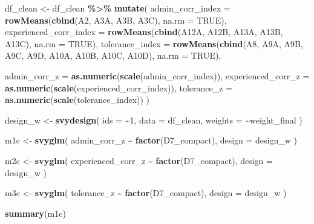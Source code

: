 \documentclass[
]{article}
\newenvironment{Shaded}{\begin{snugshade}}{\end{snugshade}}
\newcommand{\AttributeTok}[1]{\textcolor[rgb]{0.13,0.29,0.53}{#1}}
\newcommand{\ConstantTok}[1]{\textcolor[rgb]{0.56,0.35,0.01}{#1}}
\newcommand{\DecValTok}[1]{\textcolor[rgb]{0.00,0.00,0.81}{#1}}
\newcommand{\FunctionTok}[1]{\textcolor[rgb]{0.13,0.29,0.53}{\textbf{#1}}}
\newcommand{\NormalTok}[1]{#1}
\newcommand{\OtherTok}[1]{\textcolor[rgb]{0.56,0.35,0.01}{#1}}
\newcommand{\SpecialCharTok}[1]{\textcolor[rgb]{0.81,0.36,0.00}{\textbf{#1}}}
\begin{document}
\begin{Shaded}
\begin{Highlighting}[]
\NormalTok{df\_clean }\OtherTok{\textless{}{-}}\NormalTok{ df\_clean }\SpecialCharTok{\%\textgreater{}\%}
  \FunctionTok{mutate}\NormalTok{(}
    \AttributeTok{admin\_corr\_index =} \FunctionTok{rowMeans}\NormalTok{(}\FunctionTok{cbind}\NormalTok{(A2, A3A, A3B, A3C), }\AttributeTok{na.rm =} \ConstantTok{TRUE}\NormalTok{),}
    \AttributeTok{experienced\_corr\_index =} \FunctionTok{rowMeans}\NormalTok{(}\FunctionTok{cbind}\NormalTok{(A12A, A12B, A13A, A13B, A13C), }\AttributeTok{na.rm =} \ConstantTok{TRUE}\NormalTok{),}
    \AttributeTok{tolerance\_index =} \FunctionTok{rowMeans}\NormalTok{(}\FunctionTok{cbind}\NormalTok{(A8, A9A, A9B, A9C, A9D, A10A, A10B, A10C, A10D), }\AttributeTok{na.rm =} \ConstantTok{TRUE}\NormalTok{),}

    \AttributeTok{admin\_corr\_z =} \FunctionTok{as.numeric}\NormalTok{(}\FunctionTok{scale}\NormalTok{(admin\_corr\_index)),}
    \AttributeTok{experienced\_corr\_z =} \FunctionTok{as.numeric}\NormalTok{(}\FunctionTok{scale}\NormalTok{(experienced\_corr\_index)),}
    \AttributeTok{tolerance\_z =} \FunctionTok{as.numeric}\NormalTok{(}\FunctionTok{scale}\NormalTok{(tolerance\_index))}
\NormalTok{  )}
\end{Highlighting}
\end{Shaded}

\begin{Shaded}
\begin{Highlighting}[]
\NormalTok{design\_w }\OtherTok{\textless{}{-}} \FunctionTok{svydesign}\NormalTok{(}
  \AttributeTok{ids =} \SpecialCharTok{\textasciitilde{}}\DecValTok{1}\NormalTok{,}
  \AttributeTok{data =}\NormalTok{ df\_clean,}
  \AttributeTok{weights =} \SpecialCharTok{\textasciitilde{}}\NormalTok{weight\_final}
\NormalTok{)}
\end{Highlighting}
\end{Shaded}

\begin{Shaded}
\begin{Highlighting}[]
\NormalTok{m1c }\OtherTok{\textless{}{-}} \FunctionTok{svyglm}\NormalTok{(}
\NormalTok{  admin\_corr\_z }\SpecialCharTok{\textasciitilde{}} \FunctionTok{factor}\NormalTok{(D7\_compact),}
  \AttributeTok{design =}\NormalTok{ design\_w}
\NormalTok{)}

\NormalTok{m2c }\OtherTok{\textless{}{-}} \FunctionTok{svyglm}\NormalTok{(}
\NormalTok{  experienced\_corr\_z }\SpecialCharTok{\textasciitilde{}} \FunctionTok{factor}\NormalTok{(D7\_compact),}
  \AttributeTok{design =}\NormalTok{ design\_w}
\NormalTok{)}

\NormalTok{m3c }\OtherTok{\textless{}{-}} \FunctionTok{svyglm}\NormalTok{(}
\NormalTok{  tolerance\_z }\SpecialCharTok{\textasciitilde{}} \FunctionTok{factor}\NormalTok{(D7\_compact),}
  \AttributeTok{design =}\NormalTok{ design\_w}
\NormalTok{)}

\FunctionTok{summary}\NormalTok{(m1c)}
\end{Highlighting}
\end{Shaded}
\end{document}
